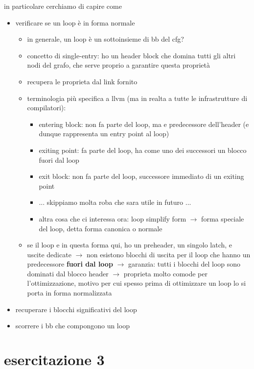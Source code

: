 in particolare cerchiamo di capire come
\begin{itemize}
  \item verificare se un loop \`e in forma normale
  \begin{itemize}
    \item in generale, un loop \`e un sottoinsieme di bb del cfg?
    \item concetto di single-entry: ho un header block che domina tutti gli altri nodi del grafo, che serve proprio a garantire questa propriet\`a
    \item recupera le proprieta dal link fornito
    \item terminologia pi\`u specifica a llvm (ma in realta a tutte le infrastrutture di compilatori):
    \begin{itemize}
      \item entering block: non fa parte del loop, ma e predecessore dell'header (e dunque rappresenta un entry point al loop)
      \item exiting point: fa parte del loop, ha come uno dei successori un blocco fuori dal loop
      \item exit block: non fa parte del loop, successore immediato di un exiting point
      \item ... skippiamo molta roba che sara utile in futuro ...
      \item altra cosa che ci interessa ora: loop simplify form $\rightarrow$ forma speciale del loop, detta forma canonica o normale
    \end{itemize}
  \item se il loop e in questa forma qui, ho un preheader, un singolo latch, e uscite dedicate $\rightarrow$ non esistono blocchi di uscita per il loop che hanno un predecessore \textbf{fuori dal loop} $\rightarrow$ garanzia: tutti i blocchi del loop sono dominati dal blocco header $\rightarrow$ proprieta molto comode per l'ottimizzazione, motivo per cui spesso prima di ottimizzare un loop lo si porta in forma normalizzata
  \end{itemize}
  \item recuperare i blocchi significativi del loop
  \item scorrere i bb che compongono un loop
\end{itemize}

\section{esercitazione 3}

